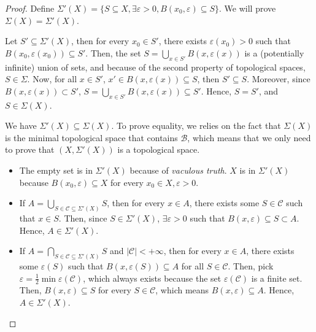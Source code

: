 \begin{proof}
  Define \( \Sigma'(X) = \{ S \subseteq X, \exists \varepsilon>0, 
B(x_{0}, \varepsilon) \subseteq S \}\). We will prove \( \Sigma(X) = \Sigma'(X)
  \).

  Let \( S' \subseteq \Sigma'(X) \), then for every \( x_{0} \in S' \), there
  exists \( \varepsilon(x_{0}) > 0 \) such that \( B(x_{0}, \varepsilon(x_{0}))
  \subseteq  S'\). Then, the set \( S = \bigcup_{x \in S'} B(x, \varepsilon(x)) \)
  is a (potentially infinite) union of sets, and because of the second
  property of topological spaces, \( S \in \Sigma \). Now, for all \( x \in S' \),
  \( x' \in B(x, \varepsilon(x)) \subseteq S \), then
  \( S' \subseteq S \). Moreover, since \( B(x, \varepsilon(x)) \subset S' \), \(
  S = \bigcup_{x \in S'} B(x, \varepsilon(x)) \subseteq  S' \). Hence, \( S = S'
  \), and \( S \in \Sigma(X) \).

  We have \( \Sigma'(X) \subseteq \Sigma(X) \). To prove equality, we relies on
  the fact that \( \Sigma(X) \) is the minimal topological space that contains
  \( \mathcal{B} \), which means that we only need to prove that \( (X,
  \Sigma'(X)) \) is a topological space.

  \begin{itemize}
    \item The empty set is in \( \Sigma'(X) \) because of \textit{vaculous
      truth}. \( X \) is in \( \Sigma'(X) \) because \( B(x_{0}, \varepsilon)
      \subseteq  X \) for every \( x_{0} \in X, \varepsilon > 0 \).
    \item If \( A = \bigcup_{S \in \mathcal{C} \subseteq \Sigma'(X)} S \), then
      for every \( x \in A \), there exists some \( S \in \mathcal{C} \) such
      that \( x \in S \). Then, since \( S \in \Sigma'(X) \), \( \exists
      \varepsilon > 0 \) such that \( B(x, \varepsilon) \subseteq S \subset A \).
      Hence, \( A \in \Sigma'(X) \).
    \item If \( A = \bigcap_{{S \in \mathcal{C} \subseteq \Sigma'(X)}} S \) and \(
      |\mathcal{C}| < +\infty\), then for every \( x \in A \), there exists some
      \( \varepsilon(S) \) such that \( B(x, \varepsilon(S)) \subseteq A \) for
      all \( S \in \mathcal{C} \). Then, pick \( \varepsilon = \frac{1}{2}\min
      \varepsilon(\mathcal{C}) \), which always exists because the set \(
      \varepsilon(\mathcal{C}) \) is a finite set. Then, \( B(x, \varepsilon)
      \subseteq S \) for every \( S \in \mathcal{C} \), which means \( B(x,
      \varepsilon) \subseteq  A \). Hence, \( A \in \Sigma'(X) \).
  \end{itemize}


\end{proof}
